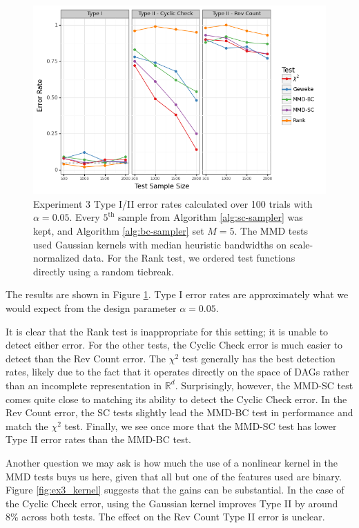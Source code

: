 \documentclass[a4paper,11pt]{article}
\begin{document}
\begin{figure}
    \centering
    \includegraphics[width=\textwidth]{figures/graph_comparison.png}
    \caption{Experiment 3 Type I/II error rates calculated over 100 trials with $\alpha=0.05$. Every $5^{\text{th}}$ sample from Algorithm \ref{alg:sc-sampler} was kept, and Algorithm \ref{alg:bc-sampler} set $M=5$. The MMD tests used Gaussian kernels with median heuristic bandwidths on scale-normalized data. For the Rank test, we ordered test functions directly using a random tiebreak.}
    \label{fig:ex3_comparison}
\end{figure}

The results are shown in Figure \ref{fig:ex3_comparison}. Type I error rates are approximately what we would expect from the design parameter $\alpha=0.05$.

It is clear that the Rank test is inappropriate for this setting; it is unable to detect either error. For the other tests, the Cyclic Check error is much easier to detect than the Rev Count error. The $\chi^{2}$ test generally has the best detection rates, likely due to the fact that it operates directly on the space of DAGs rather than an incomplete representation in $\mathbb{R}^{d}$. Surprisingly, however, the MMD-SC test comes quite close to matching its ability to detect the Cyclic Check error. In the Rev Count error, the SC tests slightly lead the MMD-BC test in performance and match the $\chi^{2}$ test. Finally, we see once more that the MMD-SC test has lower Type II error rates than the MMD-BC test.

Another question we may ask is how much the use of a nonlinear kernel in the MMD tests buys us here, given that all but one of the features used are binary. Figure \ref{fig:ex3_kernel} suggests that the gains can be substantial. In the case of the Cyclic Check error, using the Gaussian kernel improves Type II by around 8\% across both tests. The effect on the Rev Count Type II error is unclear.
\end{document}
